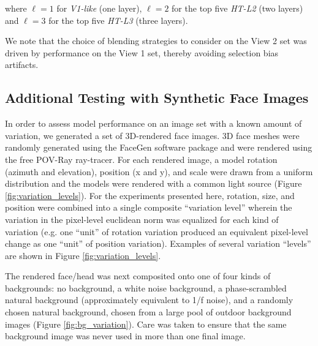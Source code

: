 where $\ell=1$ for
\emph{V1-like} (one layer), $\ell=2$ for the top five \emph{HT-L2} (two layers)
and $\ell=3$ for the top five \emph{HT-L3} (three layers).

We note that the choice of blending strategies to consider on the View 2 set was 
driven by performance on the View 1 set, thereby avoiding selection bias artifacts.

\subsection{Additional Testing with Synthetic Face Images}

In order to assess model performance on an image set with a known amount of variation, 
we generated a set of 3D-rendered face images.  3D face meshes were randomly generated
using the FaceGen software package and were rendered using
the free POV-Ray ray-tracer.  For each rendered image, a model rotation 
(azimuth and elevation), position (x and y), and scale were drawn from a uniform 
distribution and the models were rendered with a common light source (Figure \ref{fig:variation_levels}).  
For the experiments presented here, rotation, size, and position were combined into
a single composite ``variation level'' wherein the variation in the pixel-level euclidean norm
was equalized for each kind of variation (e.g. one ``unit'' of rotation variation produced an
equivalent pixel-level change as one ``unit'' of position variation).  Examples of several
variation ``levels'' are shown in Figure \ref{fig:variation_levels}.

The rendered face/head was next composited onto one of four kinds of backgrounds: no
background, a white noise background, a phase-scrambled natural background 
(approximately equivalent to 1/f noise), and a randomly chosen natural background, chosen from
a large pool of outdoor background images (Figure \ref{fig:bg_variation}).  Care was taken 
to ensure that the same background image was never used in more than one final image.

